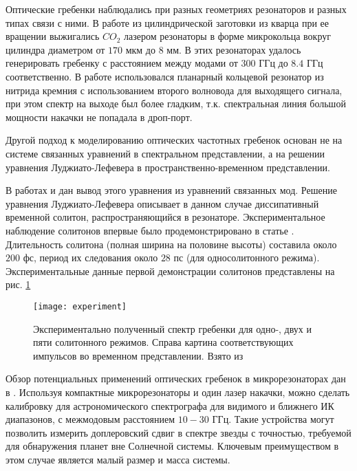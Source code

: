 Оптические гребенки наблюдались при разных геометриях резонаторов и разных типах связи с ними. В работе \cite{DelHaye2013} из цилиндрической заготовки из кварца при ее вращении выжигались $CO_2$ лазером резонаторы в форме микрокольца вокруг цилиндра диаметром от $170$ мкм до $8$ мм. В этих резонаторах удалось генерировать гребенку с расстоянием между модами от $300$ ГГц до $8.4$ ГГц соответственно. В работе \cite{Wang2013oe} использовался планарный кольцевой резонатор из нитрида кремния с использованием второго волновода для выходящего сигнала, при этом спектр на выходе был более гладким, т.к. спектральная линия большой мощности накачки не попадала в дроп-порт.

Другой подход к моделированию оптических частотных гребенок основан не на системе связанных уравнений в спектральном представлении, а на решении уравнения Луджиато-Лефевера в пространственно-временном представлении.

В работах \cite{Matsko2011} и \cite{Chembo2013} дан вывод этого уравнения из уравнений связанных мод. Решение уравнения Луджиато-Лефевера описывает в данном случае диссипативный временной солитон, распространяющийся в резонаторе. Экспериментальное наблюдение солитонов впервые было продемонстрировано в статье \cite{Herr2014}. Длительность солитона (полная ширина на половине высоты) составила около $200$ фс, период их следования около $28$ пс (для односолитонного режима). Экспериментальные данные первой демонстрации солитонов представлены на рис. \ref{experiment}

\begin{figure}
  \texttt{[image: experiment]}
  \caption{Экспериментально полученный спектр гребенки для одно-, двух и пяти солитонного режимов. Справа картина соответствующих импульсов во временном представлении. Взято из \cite{Herr2014}} \label{experiment}
\end{figure}

Обзор потенциальных применений оптических гребенок в микрорезонаторах дан в \cite{Kippenberg2011}. Используя компактные микрорезонаторы и один лазер накачки, можно сделать калибровку для астрономического спектрографа для видимого и ближнего ИК диапазонов, с межмодовым расстоянием $10-30$ ГГц. Такие устройства могут позволить измерить доплеровский сдвиг в спектре звезды с точностью, требуемой для обнаружения планет вне Солнечной системы. Ключевым преимуществом в этом случае является малый размер и масса системы.

